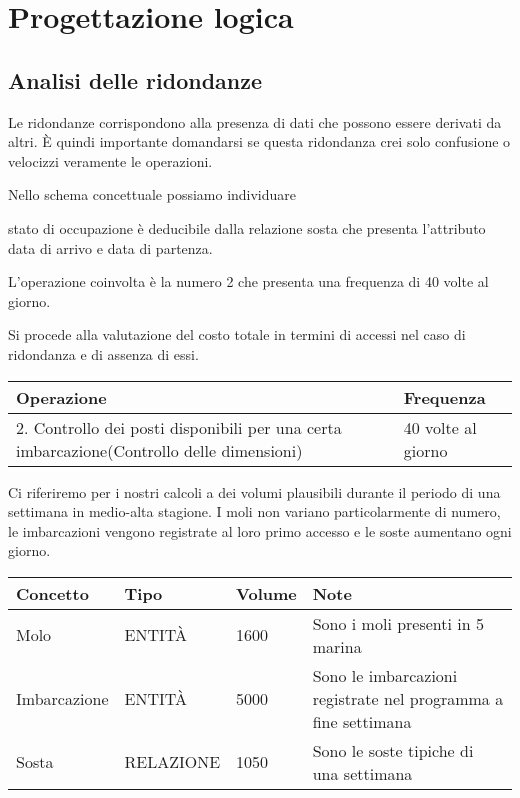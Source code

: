 \section{Progettazione logica}

\subsection{Analisi delle ridondanze}
Le ridondanze corrispondono alla presenza di dati che possono essere derivati da altri. È quindi importante domandarsi se questa ridondanza crei solo confusione o velocizzi veramente le operazioni.

Nello schema concettuale possiamo individuare 

stato di occupazione è deducibile dalla relazione sosta che presenta l'attributo data di arrivo e data di partenza.

L'operazione coinvolta è la numero 2 che presenta una frequenza di 40 volte al giorno.

Si procede alla valutazione del costo totale in termini di accessi nel caso di ridondanza e di assenza di essi.

\begin{center}
    \begin{tabularx}{\textwidth}{|p{90mm}|X|}
        \hline
        \rowcolor{gray!30}
        \textbf{Operazione} & \textbf{Frequenza}\\
        \hline
        2. Controllo dei posti disponibili per una certa imbarcazione(Controllo delle dimensioni)& 40 volte al giorno\\
        \hline
    \end{tabularx}
\end{center}

Ci riferiremo per i nostri calcoli a dei volumi plausibili durante il periodo di una settimana in medio-alta stagione. I moli non variano particolarmente di numero, le imbarcazioni vengono registrate al loro primo accesso e le soste aumentano ogni giorno.

\begin{center}
    \begin{tabularx}{\textwidth}{|X|X|X|X|}
        \hline
        \rowcolor{gray!30}
        \textbf{Concetto} & \textbf{Tipo} & \textbf{Volume} & \textbf{Note} \\
        \hline
        Molo & ENTITÀ & 1600 & Sono i moli presenti in 5 marina\\
        \hline
        Imbarcazione & ENTITÀ & 5000 & Sono le imbarcazioni registrate nel programma a fine settimana\\
        \hline
        Sosta & RELAZIONE & 1050 & Sono le soste tipiche di una settimana \\
        \hline
    \end{tabularx}
\end{center}

